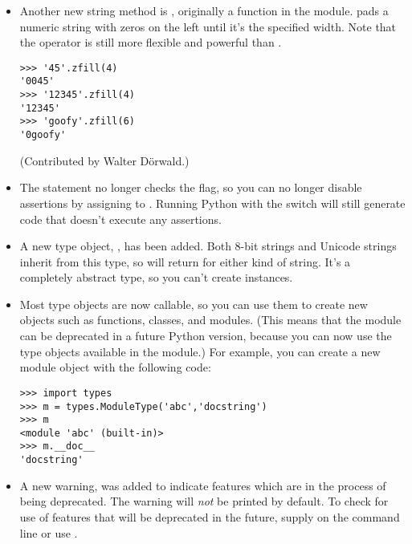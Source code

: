\documentclass{howto}
\begin{document}
\begin{itemize}
\item Another new string method is , originally a
function in the  module.   pads a
numeric string with zeros on the left until it's the specified width.
Note that the \code{\%} operator is still more flexible and powerful
than .

\begin{verbatim}
>>> '45'.zfill(4)
'0045'
>>> '12345'.zfill(4)
'12345'
>>> 'goofy'.zfill(6)
'0goofy'
\end{verbatim}

(Contributed by Walter D\"orwald.)

\item The  statement no longer  checks the 
flag, so you can no longer disable assertions by assigning to .
Running Python with the  switch will still generate 
code that doesn't execute any assertions.

\item A new type object, , has been added.  
   Both 8-bit strings and Unicode strings inherit from this type, so
    will return  for
   either kind of string.  It's a completely abstract type, so you
   can't create  instances.

\item Most type objects are now callable, so you can use them
to create new objects such as functions, classes, and modules.  (This
means that the  module can be deprecated in a future
Python version, because you can now use the type objects available
in the  module.)
For example, you can create a new module object with the following code:

\begin{verbatim}
>>> import types
>>> m = types.ModuleType('abc','docstring')
>>> m
<module 'abc' (built-in)>
>>> m.__doc__
'docstring'
\end{verbatim}

\item 
A new warning,  was added to
indicate features which are in the process of being
deprecated.  The warning will \emph{not} be printed by default.  To
check for use of features that will be deprecated in the future,
supply  on the
command line or use .


\end{itemize}
\end{document}
